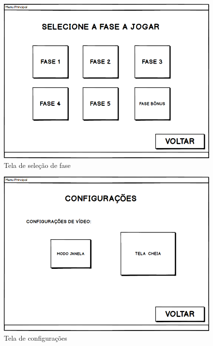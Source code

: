 \begin{figure}[!h]
    \label{Tfase}
    \centering
    \caption{Tela de seleção de fase}
    \includegraphics[keepaspectratio=true,scale=0.35]{images/JOGAR.png}
\end{figure}

\begin{figure}[!h]
    \label{Tconfig}
    \centering
    \caption{Tela de configurações}
    \includegraphics[keepaspectratio=true,scale=0.35]{images/CONFIG.png}
\end{figure}

